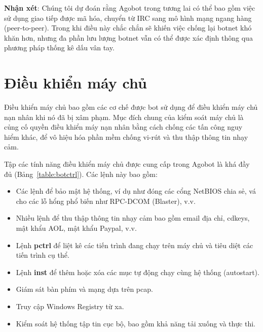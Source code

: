 

\textbf{Nhận xét}:
Chúng tôi dự đoán rằng Agobot trong tương lai có thể bao gồm việc sử dụng giao tiếp được mã hóa,
chuyển từ IRC sang mô hình mạng ngang hàng (peer-to-peer).
Trong khi điều này chắc chắn sẽ khiến việc chống lại botnet khó khăn hơn,
nhưng đa phần lưu lượng botnet vẫn có thể được xác định thông qua phương pháp thống kê dấu vân tay.

\section{Điều khiển máy chủ}

Điều khiển máy chủ bao gồm các cơ chế được bot sử dụng để điều khiển máy chủ nạn nhân khi nó đã bị xâm phạm. Mục đích chung của kiểm soát máy chủ là củng cố quyền điều khiển máy nạn nhân bằng
cách chống các tấn công nguy hiểm khác,
để vô hiệu hóa phần mềm chống vi-rút và thu thập thông tin nhạy cảm.

Tập các tính năng điều khiển máy chủ được cung cấp trong Agobot là khá đầy đủ (Bảng~\ref{table:botctrl}).
Các lệnh này bao gồm:

\begin{itemize}
\item Các lệnh để bảo mật hệ thống, ví dụ như đóng các cổng NetBIOS chia sẻ,
	vá cho các lỗ hổng phổ biến như RPC-DCOM (Blaster), v.v.
\item Nhiều lệnh để thu thập thông tin nhạy cảm bao gồm email
	địa chỉ, cdkeys, mật khẩu AOL, mật khẩu Paypal, v.v.
\item Lệnh \textbf{pctrl} để liệt kê các tiến trình đang chạy trên máy chủ và
	tiêu diệt các tiến trình cụ thể.
\item Lệnh \textbf{inst} để thêm hoặc xóa các mục tự động chạy cùng hệ thống (autostart).
\item Giám sát bàn phím và mạng dựa trên pcap.
\item Truy cập Windows Registry từ xa.
\item Kiểm soát hệ thống tập tin cục bộ, bao gồm khả năng tải xuống và thực thi.
\end{itemize}

